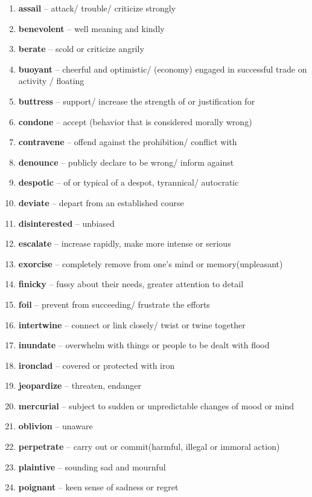 \begin{enumerate}[wide,labelindent=0pt]
\item \textbf{assail} -- attack/ trouble/ criticize strongly
\item \textbf{benevolent} -- well meaning and kindly
\item \textbf{berate} -- scold or criticize angrily
\item \textbf{buoyant} -- cheerful and optimistic/ (economy) engaged in successful trade on activity / floating
\item \textbf{buttress} -- support/ increase the strength of or justification for
\item \textbf{condone} -- accept (behavior that is considered morally wrong)
\item \textbf{contravene} -- offend against the prohibition/ conflict with
\item \textbf{denounce} -- publicly declare to be wrong/ inform against
\item \textbf{despotic} -- of or typical of a despot, tyrannical/ autocratic
\item \textbf{deviate} -- depart from an established course
\item \textbf{disinterested} -- unbiased
\item \textbf{escalate} -- increase rapidly, make more intense or serious
\item \textbf{exorcise} -- completely remove from one's mind or memory(unpleasant)
\item \textbf{finicky} -- fussy about their needs, greater attention to detail
\item \textbf{foil} -- prevent from succeeding/ frustrate the efforts
\item \textbf{intertwine} -- connect or link closely/ twist or twine together
\item \textbf{inundate} -- overwhelm with things or people to be dealt with flood
\item \textbf{ironclad} -- covered or protected with iron
\item \textbf{jeopardize} -- threaten, endanger
\item \textbf{mercurial} -- subject to sudden or unpredictable changes of mood or mind
\item \textbf{oblivion} -- unaware
\item \textbf{perpetrate} -- carry out or commit(harmful, illegal or immoral action)
\item \textbf{plaintive} -- sounding sad and mournful
\item \textbf{poignant} -- keen sense of sadness or regret

\end{enumerate}
